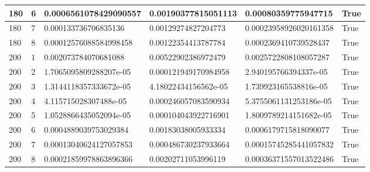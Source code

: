 \documentclass[a4paper, 12pt]{report}
\def\tabsize{4.4cm}
\def\stabsize{0.97cm}
\def\mtabsize{0.73cm}
\begin{document}
\begin{center}
\begin{longtable}{|m{\stabsize}|m{\stabsize}|m{\tabsize}|m{\tabsize}|m{\tabsize}|m{\mtabsize}|}
180 & 6 & 0.0006561078429090557 & 0.00190377815051113 & 0.00080359775947715 & True \\ \hline  
180 & 7 & 0.000133736706835136 & 0.00129274827204773 & 0.00023958926020161358 & True \\ \hline  
180 & 8 & 0.00012576088584998458 & 0.00122354413787784 & 0.0002369410739528437 & True \\ \hline  
200 & 1 & 0.002073784070681088 & 0.00522902386972479 & 0.0025722808108057287 & True \\ \hline  
200 & 2 & 1.7065095809288207e-05 & 0.000121949170984958 & 2.940195766394337e-05 & True \\ \hline  
200 & 3 & 1.3144118357333672e-05 & 4.18022434156562e-05 & 1.739923165538816e-05 & True \\ \hline  
200 & 4 & 4.115715028307488e-05 & 0.000246057083590934 & 5.3755061131253186e-05 & True \\ \hline  
200 & 5 & 1.0528866435052094e-05 & 0.000104043922716901 & 1.8009789214151682e-05 & True \\ \hline  
200 & 6 & 0.0004889039753029384 & 0.00183038005933334 & 0.0006179715818090077 & True \\ \hline  
200 & 7 & 0.00013040624127057853 & 0.000486730237933664 & 0.00015745285441057832 & True \\ \hline  
200 & 8 & 0.00021859978863896366 & 0.00202711053996119 & 0.00036371557013522486 & True \\ \hline
\end{longtable}
\end{center}
\end{document}

